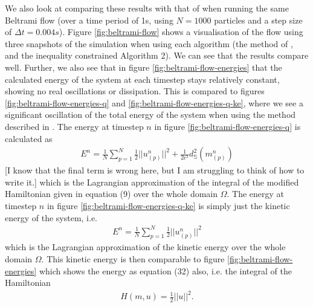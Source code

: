 \documentclass[11pt, oneside]{article}   	%
\newcommand{\dt}{\Delta t}
\newcommand{\Sb}{\mathbb{S}}
\begin{document}
We also look at comparing these results with that of \cite{gallouet2016lagrangian} when running the same Beltrami flow (over a time period of 1s, using \(N = 1000\) particles and a step size of \(\dt = 0.004s\)). Figure \ref{fig:beltrami-flow} shows a visualisation of the flow using three snapshots of the simulation when using each algorithm (the method of \cite{gallouet2016lagrangian}, and the inequality constrained Algorithm 2). We can see that the results compare well. Further, we also see that in figure \ref{fig:beltrami-flow-energies} that the calculated energy of the system at each timestep stays relatively constant, showing no real oscillations or dissipation. This is compared to figures \ref{fig:beltrami-flow-energies-q} and \ref{fig:beltrami-flow-energies-q-ke}, where we see a significant oscillation of the total energy of the system when using the method described in \cite{gallouet2016lagrangian}. The energy at timestep \(n\) in figure \ref{fig:beltrami-flow-energies-q} is calculated as
\begin{align}
E^n = \frac{1}{N} \sum_{p = 1}^{N} \frac{1}{2} || u^n_{(p)} ||^2 + \frac{1}{2 \epsilon^2} d^2_{\Sb}(m^n_{(p)}) 
\end{align} 
[I know that the final term is wrong here, but I am struggling to think of how to write it.]
which is the Lagrangian approximation of the integral of the modified Hamiltonian given in equation (9) over the whole domain \(\Omega\). The energy at timestep \(n\) in figure \ref{fig:beltrami-flow-energies-q-ke} is simply just the kinetic energy of the system, i.e.
\begin{align}
E^n = \frac{1}{N} \sum_{p = 1}^{N} \frac{1}{2} || u^n_{(p)} ||^2
\end{align} 
which is the Lagrangian approximation of the kinetic energy over the whole domain \(\Omega\). This kinetic energy is then comparable to figure \ref{fig:beltrami-flow-energies} which shows the energy as equation (32) also, i.e. the integral of the Hamiltonian
\begin{align}
H(m, u) = \frac{1}{2} || u ||^2.
\end{align}
\end{document}
